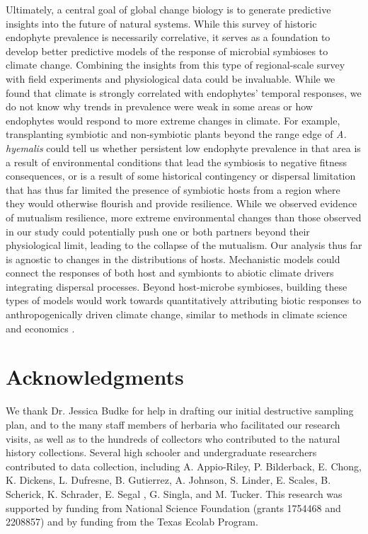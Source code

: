 \documentclass[11pt]{article}
\begin{document}
Ultimately, a central goal of global change biology is to generate predictive insights into the future of natural systems. 
While this survey of historic endophyte prevalence is necessarily correlative, it serves as a foundation to develop better predictive models of the response of microbial symbioses to climate change. 
Combining the insights from this type of regional-scale survey with field experiments and physiological data could be invaluable. 
While we found that climate is strongly correlated with endophytes' temporal responses, we do not know why trends in prevalence were weak in some areas or how endophytes would respond to more extreme changes in climate.
For example, transplanting symbiotic and non-symbiotic plants beyond the range edge of \emph{A. hyemalis} could tell us whether persistent low endophyte prevalence in that area is a result of environmental conditions that lead the symbiosis to negative fitness consequences, or is a result of some historical contingency or dispersal limitation that has thus far limited the presence of symbiotic hosts from a region where they would otherwise flourish and provide resilience.
While we observed evidence of mutualism resilience, more extreme environmental changes than those observed in our study could potentially push one or both partners beyond their physiological limit, leading to the collapse of the mutualism. 
Our analysis thus far is agnostic to changes in the distributions of hosts. 
Mechanistic models could connect the responses of both host and symbionts to abiotic climate drivers integrating dispersal processes. 
Beyond host-microbe symbioses, building these types of models would work towards quantitatively attributing biotic responses to anthropogenically driven climate change, similar to methods in climate science and economics \citep{stott2010detection, carleton2016social}.



	
	\section*{Acknowledgments}
	We thank Dr. Jessica Budke for help in drafting our initial destructive sampling plan, and to the many staff members of herbaria who facilitated our research visits, as well as to the hundreds of collectors who contributed to the natural history collections. 
	Several high schooler and undergraduate researchers contributed to data collection, including A. Appio-Riley, P. Bilderback, E. Chong, K. Dickens, L. Dufresne, B. Gutierrez, A. Johnson, S. Linder, E. Scales, B. Scherick, K. Schrader, E. Segal , G. Singla, and M. Tucker.
	This research was supported by funding from National Science Foundation (grants 1754468 and 2208857) and by funding from the Texas Ecolab Program.
\end{document}
